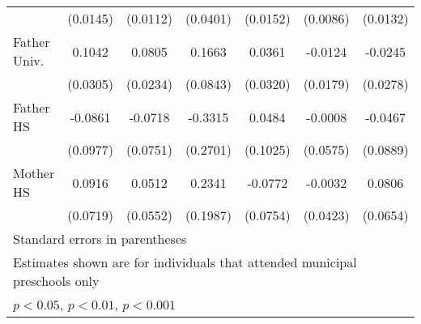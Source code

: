 \begin{table}[htbp]
\begin{tabular}{l*{6}{c}}
            &    (0.0145)         &    (0.0112)         &    (0.0401)         &    (0.0152)         &    (0.0086)         &    (0.0132)         \\
\addlinespace
Father Univ.&      0.1042\sym{***}&      0.0805\sym{***}&      0.1663\sym{*}  &      0.0361         &     -0.0124         &     -0.0245         \\
            &    (0.0305)         &    (0.0234)         &    (0.0843)         &    (0.0320)         &    (0.0179)         &    (0.0278)         \\
\addlinespace
Father HS   &     -0.0861         &     -0.0718         &     -0.3315         &      0.0484         &     -0.0008         &     -0.0467         \\
            &    (0.0977)         &    (0.0751)         &    (0.2701)         &    (0.1025)         &    (0.0575)         &    (0.0889)         \\
\addlinespace
Mother HS   &      0.0916         &      0.0512         &      0.2341         &     -0.0772         &     -0.0032         &      0.0806         \\
            &    (0.0719)         &    (0.0552)         &    (0.1987)         &    (0.0754)         &    (0.0423)         &    (0.0654)         \\
\bottomrule
\multicolumn{7}{l}{\footnotesize Standard errors in parentheses}\\
\multicolumn{7}{l}{\footnotesize Estimates shown are for individuals that attended municipal preschools only}\\
\multicolumn{7}{l}{\footnotesize \sym{*} \(p<0.05\), \sym{**} \(p<0.01\), \sym{***} \(p<0.001\)}\\
\end{tabular}
\end{table}
